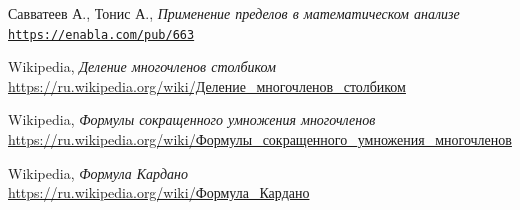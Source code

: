 \documentclass[12pt]{article}
\begin{document}
\begin{thebibliography}{9}
	Савватеев А., Тонис А., \textit{Применение пределов в математическом анализе}
	\\\texttt{\url{https://enabla.com/pub/663}}
	
	Wikipedia, \textit{Деление многочленов столбиком}
	\\\href{https://ru.wikipedia.org/wiki/\%D0\%94\%D0\%B5\%D0\%BB\%D0\%B5\%D0\%BD\%D0\%B8\%D0\%B5_\%D0\%BC\%D0\%BD\%D0\%BE\%D0\%B3\%D0\%BE\%D1\%87\%D0\%BB\%D0\%B5\%D0\%BD\%D0\%BE\%D0\%B2_\%D1\%81\%D1\%82\%D0\%BE\%D0\%BB\%D0\%B1\%D0\%B8\%D0\%BA\%D0\%BE\%D0\%BC}{https://ru.wikipedia.org/wiki/Деление\_многочленов\_столбиком}

	Wikipedia, \textit{Формулы сокращенного умножения многочленов}
	\\\href{https://ru.wikipedia.org/wiki/\%D0\%A4\%D0\%BE\%D1\%80\%D0\%BC\%D1\%83\%D0\%BB\%D1\%8B\_\%D1\%81\%D0\%BE\%D0\%BA\%D1\%80\%D0\%B0\%D1\%89\%D1\%91\%D0\%BD\%D0\%BD\%D0\%BE\%D0\%B3\%D0\%BE\_\%D1\%83\%D0\%BC\%D0\%BD\%D0\%BE\%D0\%B6\%D0\%B5\%D0\%BD\%D0\%B8\%D1\%8F\_\%D0\%BC\%D0\%BD\%D0\%BE\%D0\%B3\%D0\%BE\%D1\%87\%D0\%BB\%D0\%B5\%D0\%BD\%D0\%BE\%D0\%B2}{https://ru.wikipedia.org/wiki/Формулы\_сокращенного\_умножения\_многочленов}

	Wikipedia, \textit{Формула Кардано}
	\\\href{https://ru.wikipedia.org/wiki/\%D0\%A4\%D0\%BE\%D1\%80\%D0\%BC\%D1\%83\%D0\%BB\%D0\%B0\_\%D0\%9A\%D0\%B0\%D1\%80\%D0\%B4\%D0\%B0\%D0\%BD\%D0\%BE}{https://ru.wikipedia.org/wiki/Формула\_Кардано}
\end{thebibliography}
\end{document}
